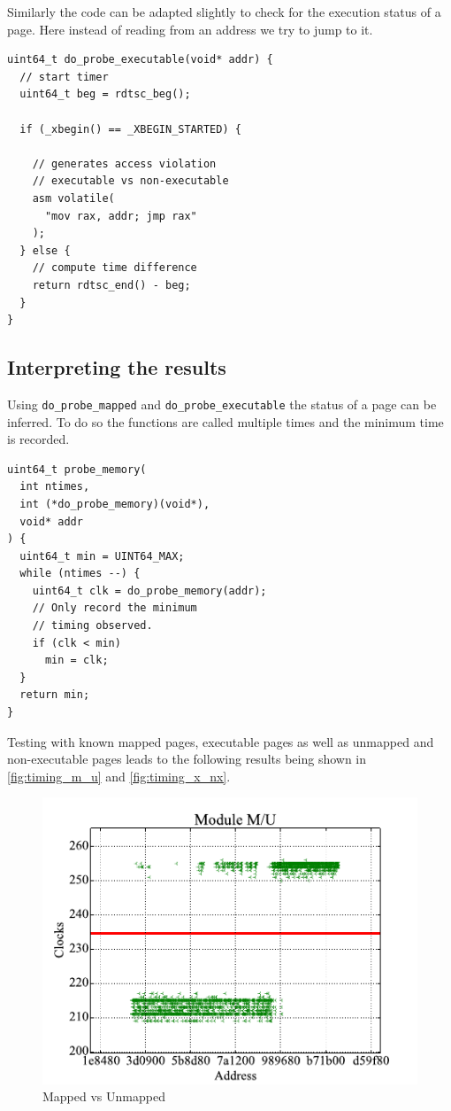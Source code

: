 Similarly the code can be adapted slightly to check for the execution status of a page.
Here instead of reading from an address we try to jump to it.

\begin{lstlisting}
uint64_t do_probe_executable(void* addr) {
  // start timer
  uint64_t beg = rdtsc_beg();

  if (_xbegin() == _XBEGIN_STARTED) {

    // generates access violation
    // executable vs non-executable
    asm volatile(
      "mov rax, addr; jmp rax"
    );
  } else {
    // compute time difference
    return rdtsc_end() - beg;
  }
}
\end{lstlisting}

\subsection{Interpreting the results}

Using \lstinline{do_probe_mapped} and \lstinline{do_probe_executable} the status of a page can be inferred.
To do so the functions are called multiple times and the minimum time is recorded.

\begin{lstlisting}
uint64_t probe_memory(
  int ntimes,
  int (*do_probe_memory)(void*),
  void* addr
) {
  uint64_t min = UINT64_MAX;
  while (ntimes --) {
    uint64_t clk = do_probe_memory(addr);
    // Only record the minimum
    // timing observed.
    if (clk < min)
      min = clk;
  }
  return min;
}
\end{lstlisting}

Testing with known mapped pages, executable pages as well as unmapped and non-executable pages leads to the following results being shown in \autoref{fig:timing_m_u} and \autoref{fig:timing_x_nx}.

\begin{figure}[h]
  \begin{center}
    \includegraphics[page=1,width=.4\textwidth]{fig/prebuilt_results_M_U}
  \end{center}
  \caption{Mapped vs Unmapped \cite[Figure~6]{drk}}
  \label{fig:timing_m_u}
\end{figure}

